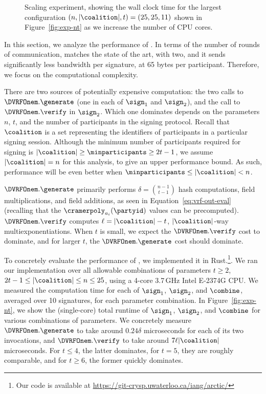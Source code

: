 \begin{figure}[t]
%
\caption{Scaling experiment, showing the wall clock time for the largest
configuration $(n,|\coalition|,t) = (25, 25, 11)$ shown in Figure~\ref{fig:exp-nt} as we increase the number
of CPU cores.}
\label{fig:exp-scaling}
\end{figure}


In this section, we analyze the performance of \glitter.  In terms of
the number of rounds of communication, \glitter matches the state of the
art, with two, and it sends significantly less bandwidth per signature,
at 65 bytes per participant.  Therefore, we focus on the computational
complexity.

There are two sources of potentially expensive computation: the two
calls to $\DVRFOnem.\generate$ (one in each of $\sign_1$ and $\sign_2$),
and the call to $\DVRFOnem.\verify$ in $\sign_2$.  Which one dominates
depends on the parameters $n$, $t$, and the number of participants in the signing protocol.
Recall that $\coalition$ is a set representing the identifiers of participants in a particular signing session.
Although the minimum number of participants required for signing is
$\lvert \coalition \rvert \geq \minparticipants \geq 2t-1$,
we assume $\lvert \coalition \rvert = n$ for this analysis,
to give an upper performance bound.
As such, performance will be even better when $\minparticipants \leq \lvert \coalition \rvert < n$.

$\DVRFOnem.\generate$ primarily performs $\delta = {n-1 \choose t-1}$
hash computations, field multiplications, and field additions, as seen
in Equation~\ref{eq:vrf-out-eval} (recalling that the $\cramerpoly_{a_i}(\partyid)$ values can be precomputed).
$\DVRFOnem.\verify$ computes $\ell=|\coalition|-t$,
$|\coalition|$-way multiexponentiations.  When $t$ is small, we expect
the $\DVRFOnem.\verify$ cost to dominate, and for larger $t$, the
$\DVRFOnem.\generate$ cost should dominate.

To concretely evaluate the performance of \glitter, we implemented it in
Rust.\footnote{Our code is available at
\url{https://git-crysp.uwaterloo.ca/iang/arctic/}}.
We ran our implementation over all allowable combinations of
parameters $t \ge 2$, $2t-1 \le |\coalition| \le n \le 25$, using a
4-core 3.7\,GHz Intel E-2374G CPU.
We measured the computation time for each of $\sign_1$,
$\sign_2$, and $\combine$, averaged over 10 signatures, for each parameter
combination.  In Figure~\ref{fig:exp-nt}, we show the (single-core)
total runtime of $\sign_1$, $\sign_2$, and $\combine$ for various
combinations of parameters.  We concretely measure $\DVRFOnem.\generate$
to take around $0.24 \delta$ microseconds for each of its two
invocations, and $\DVRFOnem.\verify$ to take around $7 \ell
|\coalition|$ microseconds.  For $t \le 4$, the latter dominates, for
$t=5$, they are roughly comparable, and for $t \ge 6$, the former
quickly dominates.

